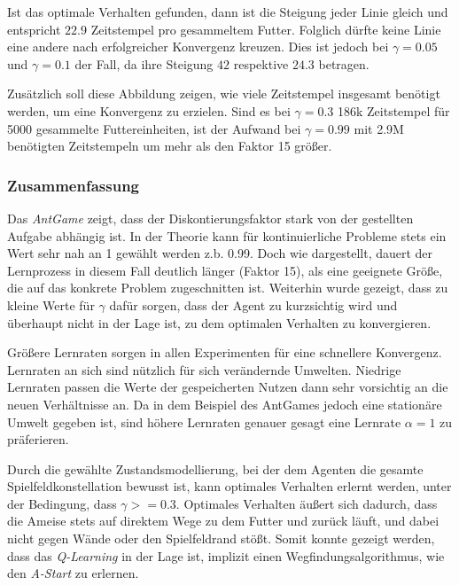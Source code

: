 Ist das optimale Verhalten gefunden, dann ist die Steigung jeder Linie gleich und entspricht $22.9$ Zeitstempel pro gesammeltem Futter. Folglich dürfte keine Linie eine andere nach erfolgreicher Konvergenz kreuzen. Dies ist jedoch bei $\gamma = 0.05$ und $\gamma = 0.1$ der Fall, da ihre Steigung $42$ respektive $24.3$ betragen.
\par 
Zusätzlich soll diese Abbildung zeigen, wie viele Zeitstempel insgesamt benötigt werden, um eine Konvergenz zu erzielen. Sind es bei $\gamma = 0.3$ 186k Zeitstempel für 5000 gesammelte Futtereinheiten, ist der Aufwand bei $\gamma = 0.99$ mit 2.9M benötigten Zeitstempeln um mehr als den Faktor 15 größer.

\subsubsection{Zusammenfassung}
Das \textit{AntGame} zeigt, dass der Diskontierungsfaktor stark von der gestellten Aufgabe abhängig ist. In der Theorie kann für kontinuierliche Probleme stets ein Wert sehr nah an 1 gewählt werden z.b. 0.99. Doch wie dargestellt, dauert der Lernprozess in diesem Fall deutlich länger (Faktor 15), als eine geeignete Größe, die auf das konkrete Problem zugeschnitten ist. Weiterhin wurde gezeigt, dass zu kleine Werte für $\gamma$ dafür sorgen, dass der Agent zu \glqq kurzsichtig\grqq{} wird und überhaupt nicht in der Lage ist, zu dem optimalen Verhalten zu konvergieren.
\par 
Größere Lernraten sorgen in allen Experimenten für eine schnellere Konvergenz. Lernraten an sich sind nützlich für sich verändernde Umwelten. Niedrige Lernraten passen die Werte der gespeicherten Nutzen dann sehr vorsichtig an die neuen Verhältnisse an. Da in dem Beispiel des AntGames jedoch eine stationäre Umwelt gegeben ist, sind höhere Lernraten genauer gesagt eine Lernrate $\alpha = 1$ zu präferieren.
\par 
Durch die gewählte Zustandsmodellierung, bei der dem Agenten die gesamte Spielfeldkonstellation bewusst ist, kann optimales Verhalten erlernt werden, unter der Bedingung, dass $\gamma >= 0.3$. Optimales Verhalten äußert sich dadurch, dass die Ameise stets auf direktem Wege zu dem Futter und zurück läuft, und dabei nicht gegen Wände oder den Spielfeldrand stößt. Somit konnte gezeigt werden, dass das \textit{Q-Learning } in der Lage ist, implizit einen Wegfindungsalgorithmus, wie den \textit{A-Start} zu erlernen.